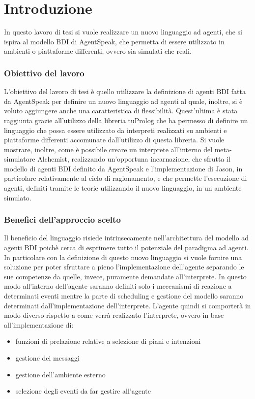 \chapter{Introduzione}
\lhead[\fancyplain{}{\bfseries\thepage}]{\fancyplain{}{\bfseries\rightmark}}
In questo lavoro di tesi si vuole realizzare un nuovo linguaggio ad agenti, che si ispira al modello BDI di AgentSpeak, che permetta di essere utilizzato in ambienti o piattaforme differenti, ovvero sia simulati che reali.

\subsection*{Obiettivo del lavoro}
L'obiettivo del lavoro di tesi è quello utilizzare la definizione di agenti BDI fatta da AgentSpeak per definire un nuovo linguaggio ad agenti al quale, inoltre, si è voluto aggiungere anche una caratteristica di flessibilità. Quest'ultima è stata raggiunta grazie all'utilizzo della libreria tuProlog che ha permesso di definire un linguaggio che possa essere utilizzato da interpreti realizzati su ambienti e piattaforme differenti accomunate dall'utilizzo di questa libreria. Si vuole mostrare, inoltre, come è possibile creare un interprete all'interno del meta-simulatore Alchemist, realizzando un'opportuna incarnazione, che sfrutta il modello di agenti BDI definito da AgentSpeak e l'implementazione di Jason, in particolare relativamente al ciclo di ragionamento, e che permette l'esecuzione di agenti, definiti tramite le teorie utilizzando il nuovo linguaggio, in un ambiente simulato.

\subsection*{Benefici dell'approccio scelto}
Il beneficio del linguaggio risiede intrinsecamente nell'architettura del modello ad agenti BDI poichè cerca di esprimere tutto il potenziale del paradigma ad agenti.
In particolare con la definizione di questo nuovo linguaggio si vuole fornire una soluzione per poter sfruttare a pieno l'implementazione dell'agente separando le sue competenze da quelle, invece, puramente demandate all'interprete.
In questo modo all'interno dell'agente saranno definiti solo i meccanismi di reazione a determinati eventi mentre la parte di scheduling e gestione del modello saranno determinati dall'implementazione dell'interprete.
L'agente quindi si comporterà in modo diverso rispetto a come verrà realizzato l'interprete, ovvero in base all'implementazione di:
\begin{itemize}
\item funzioni di prelazione relative a selezione di piani e intenzioni
\item gestione dei messaggi
\item gestione dell'ambiente esterno
\item selezione degli eventi da far gestire all'agente
\end{itemize}

